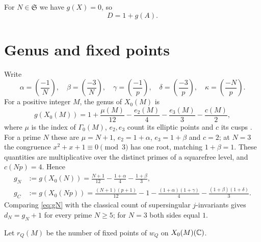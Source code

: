 \documentclass[11pt,a4paper]{article}
\theoremstyle{remark}\newtheorem{remark}[theorem]{Remark}
\numberwithin{equation}{section}
\newcommand{\leg}[2]{\left(\frac{#1}{#2}\right)}
\begin{document}
For $N\in\mathfrak S$ we have $g(X)=0$, so
\begin{equation}\label{eq:D}
D=1+g(A).
\end{equation}

\section{Genus and fixed points}
Write
\[
\alpha=\leg{-1}{N},\quad\beta=\leg{-3}{N},\quad\gamma=\leg{-1}{p},\quad\delta=\leg{-3}{p},\quad\kappa=\leg{-N}{p}.
\]
For a positive integer $M$, the genus of $X_0(M)$ is
\[
g(X_0(M))=1+\frac{\mu(M)}{12}-\frac{e_2(M)}4-\frac{e_3(M)}3-\frac{c(M)}2,
\]
where $\mu$ is the index of $\Gamma_0(M)$, $e_2,e_3$ count its elliptic points and $c$ its cusps \cite[Theorem 3.1.1 and Section 3.9]{DS}. For a prime $N$ these are $\mu=N+1$, $e_2=1+\alpha$, $e_3=1+\beta$ and $c=2$; at $N=3$ the congruence $x^2+x+1\equiv0\pmod 3$ has one root, matching $1+\beta=1$. These quantities are multiplicative over the distinct primes of a squarefree level, and $c(Np)=4$. Hence
\begin{align}
g_N&:=g(X_0(N))=\frac{N+1}{12}-\frac{1+\alpha}4-\frac{1+\beta}3,\label{eq:gN}\\
g_C&:=g(X_0(Np))=\frac{(N+1)(p+1)}{12}-1-\frac{(1+\alpha)(1+\gamma)}4-\frac{(1+\beta)(1+\delta)}3.\label{eq:gC}
\end{align}
Comparing \eqref{eq:gN} with the classical count of supersingular $j$-invariants \cite[Theorem V.4.1(c)]{Sil} gives $d_N=g_N+1$ for every prime $N\geq5$; for $N=3$ both sides equal $1$.

Let $r_Q(M)$ be the number of fixed points of $w_Q$ on $X_0(M)(\mathbb C)$.
\end{document}

